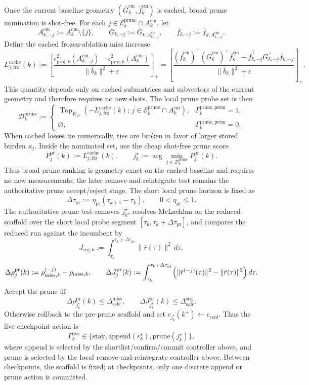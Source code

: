 \documentclass[11pt]{article}
\begin{document}
Once the current baseline geometry \((\bar G_k^{\mathrm{cm}},\bar f_k^{\mathrm{cm}})\) is cached, broad prune nomination is shot-free. For each \(j\in\mathcal E_k^{\mathrm{prune}}\cap A_k^{\mathrm{cm}}\), let
\[
A_{k,-j}^{\mathrm{cm}}
:=
A_k^{\mathrm{cm}}\setminus\{j\},
\qquad
\bar G_{k,-j}
:=
\bar G_{k,A_{k,-j}^{\mathrm{cm}}},
\qquad
\bar f_{k,-j}
:=
\bar f_{k,A_{k,-j}^{\mathrm{cm}}}.
\]
Define the cached frozen-ablation miss increase
\[
L_{j,\mathrm{frz}}^{\mathrm{cache}}(k)
:=
\left[
\frac{
\epsilon_{\mathrm{proj},k}^2(A_{k,-j}^{\mathrm{cm}})
-
\epsilon_{\mathrm{proj},k}^2(A_k^{\mathrm{cm}})
}{\|\bar b_k\|^2+\varepsilon}
\right]_+
=
\left[
\frac{
(\bar f_k^{\mathrm{cm}})^\top (\bar G_k^{\mathrm{cm}})^+\bar f_k^{\mathrm{cm}}
-
\bar f_{k,-j}^\top \bar G_{k,-j}^+\bar f_{k,-j}
}{\|\bar b_k\|^2+\varepsilon}
\right]_+.
\]
This quantity depends only on cached submatrices and subvectors of the current geometry and therefore requires no new shots. The local prune probe set is then
\[
\mathcal D_k^{\mathrm{prune}}
:=
\begin{cases}
\operatorname{Top}_{K_{\mathrm{pr}}}\!\left(-L_{j,\mathrm{frz}}^{\mathrm{cache}}(k);\,j\in\mathcal E_k^{\mathrm{prune}}\cap A_k^{\mathrm{cm}}\right),&\Gamma_k^{\mathrm{prune,perm}}=1,\\[2mm]
\varnothing,&\Gamma_k^{\mathrm{prune,perm}}=0.
\end{cases}
\]
When cached losses tie numerically, ties are broken in favor of larger stored burden \(\kappa_j\). Inside the nominated set, use the cheap shot-free prune score
\[
P_j^{\mathrm{pr}}(k)
:=
L_{j,\mathrm{frz}}^{\mathrm{cache}}(k),
\qquad
j_k^\star
:=
\arg\min_{j\in\mathcal D_k^{\mathrm{prune}}}
P_j^{\mathrm{pr}}(k).
\]
Thus broad prune ranking is geometry-exact on the cached baseline and requires no new measurements; the later remove-and-reintegrate test remains the authoritative prune accept/reject stage.
The short local prune horizon is fixed as
\[
\Delta\tau_{\mathrm{pr}}
:=
\eta_{\mathrm{pr}}(\tau_{k+1}-\tau_k),
\qquad
0<\eta_{\mathrm{pr}}\le 1.
\]
The authoritative prune test removes \(j_k^\star\), resolves McLachlan on the reduced scaffold over the short local probe segment \([\tau_k,\tau_k+\Delta\tau_{\mathrm{pr}}]\), and compares the reduced run against the incumbent by
\[
J_{\mathrm{seg},k}
:=
\int_{\tau_k}^{\tau_k+\Delta\tau_{\mathrm{pr}}}\|\bar r(\tau)\|^2\,d\tau,
\]
\[
\Delta\rho_j^{\mathrm{pr}}(k)
:=
\rho_{\mathrm{miss},k}^{(-j)}-\rho_{\mathrm{miss},k},
\qquad
\Delta J_j^{\mathrm{pr}}(k)
:=
\int_{\tau_k}^{\tau_k+\Delta\tau_{\mathrm{pr}}}
\Bigl(\|\bar r^{(-j)}(\tau)\|^2-\|\bar r(\tau)\|^2\Bigr)\,d\tau.
\]
Accept the prune iff
\[
\Delta\rho_{j_k^\star}^{\mathrm{pr}}(k)
\le
\Delta_{\mathrm{safe}}^{\mathrm{miss}},
\qquad
\Delta J_{j_k^\star}^{\mathrm{pr}}(k)
\le
\Delta_{\mathrm{safe}}^{\mathrm{seg}}.
\]
Otherwise rollback to the pre-prune scaffold and set \(c_{j_k^\star}(k^+)\leftarrow c_{\mathrm{cool}}\). Thus the live checkpoint action is
\[
\Gamma_k^{\mathrm{live}}\in\{\mathrm{stay},\mathrm{append}(r_k^\star),\mathrm{prune}(j_k^\star)\},
\]
where append is selected by the shortlist/confirm/commit controller above, and prune is selected by the local remove-and-reintegrate controller above. Between checkpoints, the scaffold is fixed; at checkpoints, only one discrete append or prune action is committed.
\end{document}
